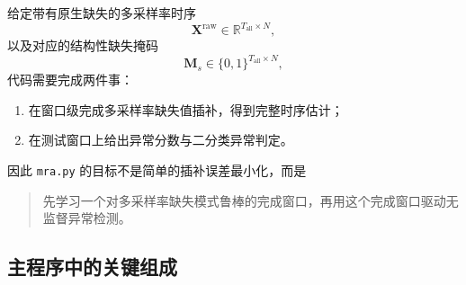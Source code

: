 \documentclass[UTF8]{ctexart}
\newcommand{\code}[1]{\texttt{#1}}
\begin{document}
给定带有原生缺失的多采样率时序
\begin{equation}
    \bm{X}^{\text{raw}} \in \mathbb{R}^{T_{\text{all}} \times N},
\end{equation}
以及对应的结构性缺失掩码
\begin{equation}
    \bm{M}_s \in \{0,1\}^{T_{\text{all}} \times N},
\end{equation}
代码需要完成两件事：
\begin{enumerate}
    \item 在窗口级完成多采样率缺失值插补，得到完整时序估计；
    \item 在测试窗口上给出异常分数与二分类异常判定。
\end{enumerate}

因此 \code{mra.py} 的目标不是简单的插补误差最小化，而是
\begin{quote}
先学习一个对多采样率缺失模式鲁棒的完成窗口，再用这个完成窗口驱动无监督异常检测。
\end{quote}

\subsection{主程序中的关键组成}
\end{document}
